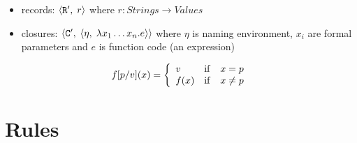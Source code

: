 \documentclass{article}
\begin{document}
\begin{itemize}
\item records: $\langle {\tt R'} , \; r \rangle$ where $r : Strings \rightarrow Values$

\item closures: $\langle {\tt C'} , \; \langle \eta , \; \lambda x_1\dots x_n. e \rangle \rangle$ where
$\eta$ is naming environment, $x_i$ are formal parameters
and $e$ is function code (an expression)
\end{itemize}

\begin{displaymath}
f [ p / v ] (x) = \left\{
\begin{array}{lll}
v & {\rm if} & x = p \\
f (x) & {\rm if} & x \neq p \\
\end{array}
\right.
\end{displaymath}

\section{Rules}


  \comprule{
  }{
    \computes{
      \seta{\q{()}}
    }{
      \pair{\sigma}{\void}
    }
  }{}
  
  
  
  
  
\end{document}
